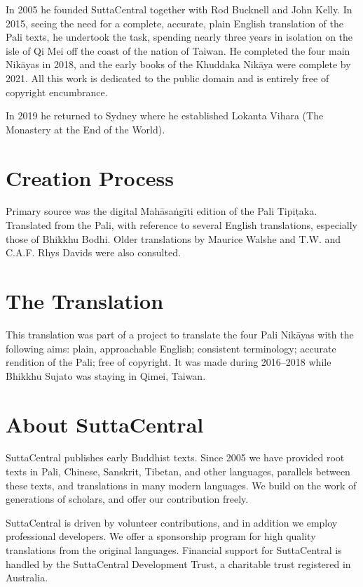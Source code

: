 \documentclass[12pt,openany]{book}%
\begin{document}
In 2005 he founded SuttaCentral together with Rod Bucknell and John Kelly. In 2015, seeing the need for a complete, accurate, plain English translation of the Pali texts, he undertook the task, spending nearly three years in isolation on the isle of Qi Mei off the coast of the nation of Taiwan. He completed the four main \textsanskrit{Nikāyas} in 2018, and the early books of the Khuddaka \textsanskrit{Nikāya} were complete by 2021. All this work is dedicated to the public domain and is entirely free of copyright encumbrance. 

In 2019 he returned to Sydney where he established Lokanta Vihara (The Monastery at the End of the World). 

\section*{Creation Process}

Primary source was the digital \textsanskrit{Mahāsaṅgīti} edition of the Pali \textsanskrit{Tipiṭaka}. Translated from the Pali, with reference to several English translations, especially those of Bhikkhu Bodhi. Older translations by Maurice Walshe and T.W. and C.A.F. Rhys Davids were also consulted.

\section*{The Translation}

This translation was part of a project to translate the four Pali \textsanskrit{Nikāyas} with the following aims: plain, approachable English; consistent terminology; accurate rendition of the Pali; free of copyright. It was made during 2016–2018 while Bhikkhu Sujato was staying in Qimei, Taiwan.

\section*{About SuttaCentral}

SuttaCentral publishes early Buddhist texts. Since 2005 we have provided root texts in Pali, Chinese, Sanskrit, Tibetan, and other languages, parallels between these texts, and translations in many modern languages. We build on the work of generations of scholars, and offer our contribution freely.

SuttaCentral is driven by volunteer contributions, and in addition we employ professional developers. We offer a sponsorship program for high quality translations from the original languages. Financial support for SuttaCentral is handled by the SuttaCentral Development Trust, a charitable trust registered in Australia.
\end{document}

